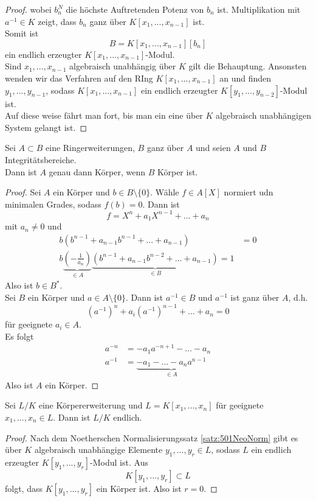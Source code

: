 \begin{proof}
		wobei $b_n^N$ die höchste Auftretenden Potenz von $b_n$ ist.
		Multiplikation mit $a^{-1}\in K$ zeigt, dass $b_n$ ganz über $K[x_1,...,x_{n-1}]$ ist.\\
		Somit ist
		\[B=K[x_1,...,x_{n-1}][b_n]\]
		ein endlich erzeugter $K[x_1,...,x_{n-1}]$-Modul.\\
		Sind $x_1,...,x_{n-1}$ algebraisch unabhängig über $K$ gilt die Behauptung. Ansonsten wenden wir das Verfahren auf den RIng $K[x_1,...,x_{n-1}]$ an und finden $y_1,...,y_{n-1}$, sodass $K[x_1,...,x_{n-1}]$ ein endlich erzeugter $K[y_1,...,y_{n-2}]$-Modul ist.\\
		Auf diese weise fährt man fort, bis man ein eine über $K$ algebraisch unabhängigen System gelangt ist.
	\end{proof}

	\begin{satz}
		Sei $A\subset B$ eine Ringerweiterungen, $B$ ganz über $A$ und seien $A$ und $B$ Integritätsbereiche.\\
		Dann ist $A$ genau dann Körper, wenn $B$ Körper ist.
	\end{satz}
	\begin{proof}
		Sei $A$ ein Körper und $b\in B\setminus\{0\}$. Wähle $f\in A[X]$ normiert udn minimalen Grades, sodass $f(b)=0$. Dann ist
		\[f=X^n+a_1X^{n-1}+...+a_n\]
		mit $a_n\neq 0$ und
		\begin{align*}
		b(b^{n-1}+a_{n-1}b^{n-1}+...+a_{n-1})&=0\\
		b\underbrace{\left(-\frac{1}{a_n}\right)}_{\in A}\underbrace{\left(b^{n-1}+a_{n-1}b^{n-2}+...+a_{n-1}\right)}_{\in B}=1
		\end{align*}
		Also ist $b\in B^*$.\\
		Sei $B$ ein Körper und $a\in A\setminus\{0\}$. Dann ist $a^{-1}\in B$ und $a^{-1}$ ist ganz über $A$, d.h.
		\[(a^{-1})^n+a_i(a^{-1})^{n-1}+...+a_n=0\]
		für geeignete $a_i\in A$.\\
		Es folgt 
		\begin{align*}
		a^{-n}&=-a_1a^{-n+1}-...-a_n\\
		a^{-1}&=\underbrace{-a_1-...-a_na^{n-1}}_{\in A}
		\end{align*}
		Also ist $A$ ein Körper.
	\end{proof}


	\begin{theorem}
		Sei $L/K$ eine Körpererweiterung und $L=K[x_1,...,x_n]$ für geeignete $x_1,...,x_n\in L$. Dann ist $L/K$ endlich.
	\end{theorem}
	\begin{proof}
		Nach dem Noetherschen Normalisierungssatz \ref{satz:501NeoNorm} gibt es über $K$ algebraisch unabhängige Elemente $y_1,...,y_r\in L$, sodass $L$ ein endlich erzeugter $K[y_1,...,y_r]$-Modul ist. Aus
		\[K[y_1,...,y_r]\subset L\] 
		folgt, dass $K[y_1,...,y_r]$ ein Körper ist. Also ist $r=0$.
	\end{proof}


